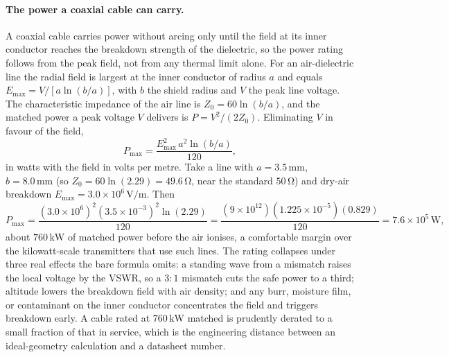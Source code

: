 \paragraph{The power a coaxial cable can carry.}
A coaxial cable carries power without arcing only until the field at its
inner conductor reaches the breakdown strength of the dielectric, so the
power rating follows from the peak field, not from any thermal limit alone.
For an air-dielectric line the radial field is largest at the inner
conductor of radius $a$ and equals $E_{\max} = V/[a\ln(b/a)]$, with $b$ the
shield radius and $V$ the peak line voltage. The characteristic impedance
of the air line is $Z_0 = 60\ln(b/a)$, and the matched power a peak voltage
$V$ delivers is $P = V^2/(2 Z_0)$. Eliminating $V$ in favour of the field,
\[
P_{\max} = \frac{E_{\max}^2\, a^2 \ln(b/a)}{120},
\]
in watts with the field in volts per metre. Take a line with $a = 3.5\,\si{
\milli\meter}$, $b = 8.0\,\si{\milli\meter}$ (so $Z_0 = 60\ln(2.29) =
49.6\,\si{\ohm}$, near the standard $50\,\si{\ohm}$) and dry-air breakdown
$E_{\max} = 3.0\times 10^{6}\,\si{\volt\per\meter}$. Then
\[
P_{\max} = \frac{(3.0\times 10^{6})^{2}(3.5\times 10^{-3})^{2}\ln(2.29)}
{120} = \frac{(9\times 10^{12})(1.225\times 10^{-5})(0.829)}{120}
= 7.6\times 10^{5}\,\si{\watt},
\]
about $760\,\si{\kilo\watt}$ of matched power before the air ionises, a
comfortable margin over the kilowatt-scale transmitters that use such
lines. The rating collapses under three real effects the bare formula
omits: a standing wave from a mismatch raises the local voltage by the
VSWR, so a $3{:}1$ mismatch cuts the safe power to a third; altitude lowers
the breakdown field with air density; and any burr, moisture film, or
contaminant on the inner conductor concentrates the field and triggers
breakdown early. A cable rated at $760\,\si{\kilo\watt}$ matched is
prudently derated to a small fraction of that in service, which is the
engineering distance between an ideal-geometry calculation and a
datasheet number.

